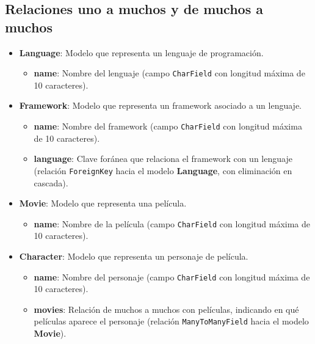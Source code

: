 \documentclass{article}
\begin{document}
    \subsection{Relaciones uno a muchos y de muchos a muchos}
    \begin{itemize}	
    \item \textbf{Language}: Modelo que representa un lenguaje de programación.
        \begin{itemize}
            \item \textbf{name}: Nombre del lenguaje (campo \texttt{CharField} con longitud máxima de 10 caracteres).
        \end{itemize}
        
    \item \textbf{Framework}: Modelo que representa un framework asociado a un lenguaje.
        \begin{itemize}
            \item \textbf{name}: Nombre del framework (campo \texttt{CharField} con longitud máxima de 10 caracteres).
            \item \textbf{language}: Clave foránea que relaciona el framework con un lenguaje (relación \texttt{ForeignKey} hacia el modelo \textbf{Language}, con eliminación en cascada).
        \end{itemize}
        
    \item \textbf{Movie}: Modelo que representa una película.
        \begin{itemize}
            \item \textbf{name}: Nombre de la película (campo \texttt{CharField} con longitud máxima de 10 caracteres).
        \end{itemize}
        
    \item \textbf{Character}: Modelo que representa un personaje de película.
        \begin{itemize}
            \item \textbf{name}: Nombre del personaje (campo \texttt{CharField} con longitud máxima de 10 caracteres).
            \item \textbf{movies}: Relación de muchos a muchos con películas, indicando en qué películas aparece el personaje (relación \texttt{ManyToManyField} hacia el modelo \textbf{Movie}).
        \end{itemize}
	\end{itemize}
    
\end{document}
